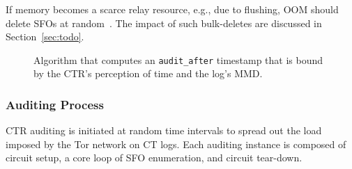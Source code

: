 If memory becomes a scarce relay resource, e.g., due to flushing, OOM
should delete SFOs at random~\cite{nordberg}.  The impact of such bulk-deletes
are discussed in Section~\ref{sec:todo}.

\begin{figure}
	\centering
	\caption{%
		Algorithm that computes an \texttt{audit\_after} timestamp that is
		bound by the CTR's perception of time and the log's MMD.
	}
	\label{fig:audit-after}
\end{figure}

\subsubsection{Auditing Process} \label{sec:design:ctr:audit}
CTR auditing is initiated at random time intervals to spread out the load
imposed by the Tor network on CT logs.  Each auditing instance is composed of
circuit setup, a core loop of SFO enumeration, and circuit tear-down.

